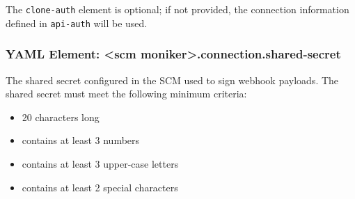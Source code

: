 The \texttt{clone-auth} element is optional;  if not provided, the connection information defined
in \texttt{api-auth} will be used.

\subsubsection{YAML Element: <scm moniker>.connection.shared-secret}\label{sec:yaml-connection-shared-secret}
The shared secret configured in the SCM used to sign webhook payloads. The shared secret must meet the
following minimum criteria: 

\begin{itemize}
  \item 20 characters long
  \item contains at least 3 numbers
  \item contains at least 3 upper-case letters
  \item contains at least 2 special characters
\end{itemize}
